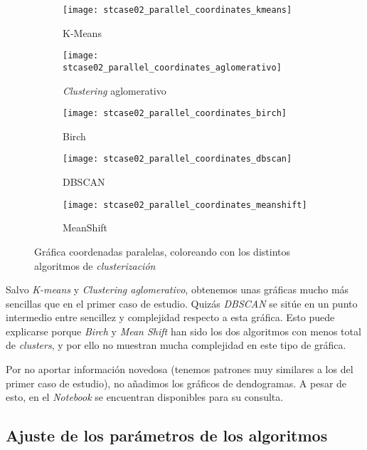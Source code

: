\documentclass[11pt]{article}
\begin{document}
\begin{figure}[H]
    \centering

    \begin{subfigure}[b]{0.45 \textwidth}
        \texttt{[image: stcase02\_parallel\_coordinates\_kmeans]}
        \caption{K-Means}
    \end{subfigure}
    \begin{subfigure}[b]{0.45 \textwidth}
        \texttt{[image: stcase02\_parallel\_coordinates\_aglomerativo]}
        \caption{\emph{Clustering} aglomerativo}
    \end{subfigure}

    \begin{subfigure}[b]{0.45 \textwidth}
        \texttt{[image: stcase02\_parallel\_coordinates\_birch]}
        \caption{Birch}
    \end{subfigure}
    \begin{subfigure}[b]{0.45 \textwidth}
        \texttt{[image: stcase02\_parallel\_coordinates\_dbscan]}
        \caption{DBSCAN}
    \end{subfigure}

    \begin{subfigure}[b]{0.45 \textwidth}
        \texttt{[image: stcase02\_parallel\_coordinates\_meanshift]}
        \caption{MeanShift}
    \end{subfigure}

    \caption{Gráfica coordenadas paralelas, coloreando con los distintos algoritmos de \emph{clusterización}}
\end{figure}

Salvo \emph{K-means} y \emph{Clustering aglomerativo}, obtenemos unas gráficas mucho más sencillas que en el primer caso de estudio. Quizás \emph{DBSCAN} se sitúe en un punto intermedio entre sencillez y complejidad respecto a esta gráfica. Esto puede explicarse porque \emph{Birch} y \emph{Mean Shift} han sido los dos algoritmos con menos total de \emph{clusters}, y por ello no muestran mucha complejidad en este tipo de gráfica.

Por no aportar información novedosa (tenemos patrones muy similares a los del primer caso de estudio), no añadimos los gráficos de dendogramas. A pesar de esto, en el \emph{Notebook} se encuentran disponibles para su consulta.

\pagebreak

\subsection{Ajuste de los parámetros de los algoritmos}
\end{document}
